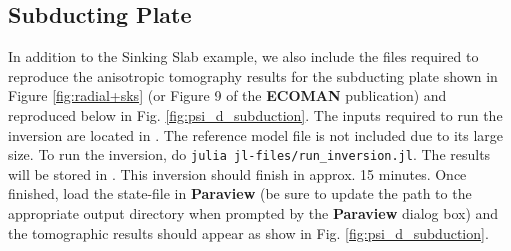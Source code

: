\subsection{Subducting Plate}
In addition to the Sinking Slab example, we also include the files required to reproduce the anisotropic tomography results for the subducting plate shown in Figure \ref{fig:radial+sks} (or Figure 9 of the \textbf{ECOMAN} publication) and reproduced below in Fig. \ref{fig:psi_d_subduction}. The inputs required to run the inversion are located in . The reference \viztomotitle{} model file is not included due to its large size. To run the inversion, do \texttt{julia jl-files/run\_inversion.jl}. The results will be stored in . This inversion should finish in approx. 15 minutes. Once finished, load the state-file  in \textbf{Paraview} (be sure to update the path to the appropriate output directory when prompted by the \textbf{Paraview} dialog box) and the tomographic results should appear as show in Fig. \ref{fig:psi_d_subduction}.

